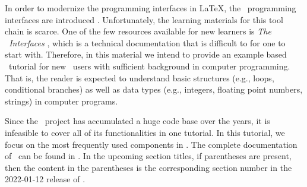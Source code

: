 \documentclass{ltugboat}
\begin{document}

In order to modernize the programming interfaces in \LaTeX, the \liii~programming interfaces are introduced \cite{mittelbach2020quo}.
Unfortunately, the learning materials for this tool chain is scarce.
One of the few resources available for new learners is \emph{The \liii\ Interfaces} \cite{l3interface}, which is a technical documentation that is difficult to for one to start with.
Therefore, in this material we intend to provide an example based \liii\ tutorial for new \liii\ users with sufficient background in computer programming.
That is, the reader is expected to understand basic structures (e.g., loops, conditional branches) as well as data types (e.g., integers, floating point numbers, strings) in computer programs. 



Since the \liii~project has accumulated a huge code base over the years, it is infeasible to cover all of its functionalities in one tutorial.
In this tutorial, we focus on the most frequently used components in \liii. 
The complete documentation of \liii\  can be found in \cite{l3interface}. 
In the upcoming section titles, if parentheses are present, then the content in the parentheses is the corresponding section number in the 2022-01-12 release of \cite{l3interface}.
\end{document}

